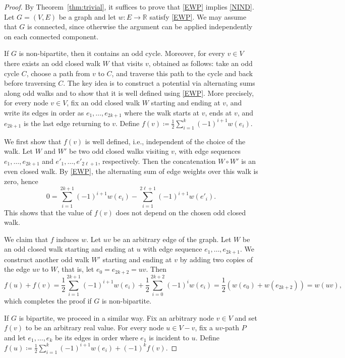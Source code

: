 \documentclass{article}
\theoremstyle{plain}
\theoremstyle{definition}
\begin{document}
\thmmainfirst*
\begin{proof}
    By Theorem~\ref{thm:trivial}, it suffices to prove that \ref{EWP} implies \ref{NIND}. Let $G=(V,E)$ be a graph and let $w\colon E \to \mathbb{R}$ satisfy \ref{EWP}. We may assume that $G$ is connected, since otherwise the argument can be applied independently on each connected component. 
        
    If $G$ is non-bipartite, then it contains an odd cycle. Moreover, for every $v \in V$ there exists an odd closed walk $W$ that visits $v$, obtained as follows: take an odd cycle $C$, choose a path from $v$ to $C$, and traverse this path to the cycle and back before traversing $C$. The key idea is to construct a potential via alternating sums along odd walks and to show that it is well defined using \ref{EWP}. More precisely, for every node $v\in V$, fix an odd closed walk $W$ starting and ending at $v$, and write its edges in order as $e_{1}, \dots, e_{2k+1}$ where the walk starts at $v$, ends at $v$, and $e_{2k+1}$ is the last edge returning to $v$. Define $f(v) \coloneqq \frac{1}{2}\sum_{i = 1}^{k} (-1)^{i+1}w(e_{i})$. 

    We first show that $f(v)$ is well defined, i.e., independent of the choice of the walk. Let $W$ and $W'$ be two odd closed walks visiting $v$, with edge sequences $e_1,\dots,e_{2k+1}$ and $e'_1,\dots,e'_{2\ell+1}$, respectively. Then the concatenation $W \circ W'$ is an even closed walk. By \ref{EWP}, the alternating sum of edge weights over this walk is zero, hence
    \[
        0=\sum_{i=1}^{2k+1} (-1)^{i+1}w(e_{i})-\sum_{i=1}^{2\ell+1} (-1)^{i+1}w(e'_{i}).
    \]
    This shows that the value of $f(v)$ does not depend on the chosen odd closed walk.

    We claim that $f$ induces $w$. Let $uv$ be an arbitrary edge of the graph. Let $W$ be an odd closed walk starting and ending at $u$ with edge sequence $e_{1},\dots,e_{2k+1}$. We construct another odd walk $W'$ starting and ending at $v$ by adding two copies of the edge $uv$ to $W$, that is, let $e_{0}=e_{2k+2}=uv$. Then
    \[
        f(u) + f(v) 
        = \frac{1}{2}\sum_{i = 1}^{2k+1} (-1)^{i+1}w(e_{i})+\frac{1}{2}\sum_{i = 0}^{2k+2} (-1)^{i}w(e_{i})
        =\frac{1}{2}(w(e_0)+w(e_{2k+2}))
        =w(uv),
    \]
    which completes the proof if $G$ is non-bipartite.

    If $G$ is bipartite, we proceed in a similar way. Fix an arbitrary node $v \in V$ and set $f(v)$ to be an arbitrary real value. For every node $u\in V-v$, fix a $uv$-path $P$ and let $e_{1}, \dots, e_{k}$ be its edges in order where $e_1$ is incident to $u$. Define $f(u) \coloneqq \frac{1}{2}\sum_{i = 1}^{k} (-1)^{i+1}w(e_{i})+(-1)^k f(v)$. 


\end{proof}
\end{document}
